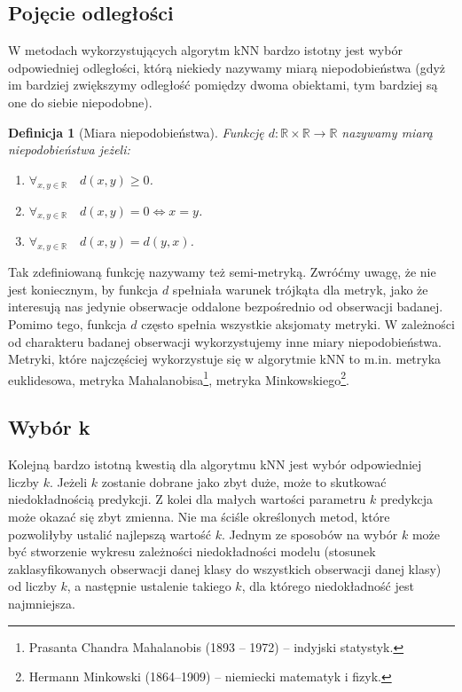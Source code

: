 \documentclass[a4paper]{article}
\newtheorem{defi} {Definicja}
\begin{document}
\subsection{Pojęcie odległości}
W metodach wykorzystujących algorytm kNN bardzo istotny jest wybór odpowiedniej odległości, którą niekiedy nazywamy miarą niepodobieństwa (gdyż im bardziej zwiększymy odległość pomiędzy dwoma obiektami, tym bardziej są one do siebie niepodobne).
\begin{defi}[Miara niepodobieństwa]
Funkcję $d: \mathbb{R} \times \mathbb{R} \to \mathbb{R}$ nazywamy miarą niepodobieństwa jeżeli:
\begin{enumerate}
    \item $\forall_{x,y\in\mathbb{R}}\quad d(x,y) \geq 0$.
    \item $\forall_{x,y\in\mathbb{R}}\quad d(x,y) = 0 \iff x = y$.
    \item $\forall_{x,y\in\mathbb{R}}\quad d(x,y) = d(y,x)$.
\end{enumerate}
\end{defi}
Tak zdefiniowaną funkcję nazywamy też semi-metryką. Zwróćmy uwagę, że nie jest koniecznym, by funkcja $d$ spełniała warunek trójkąta dla metryk, jako że interesują nas jedynie obserwacje oddalone bezpośrednio od obserwacji badanej. Pomimo tego, funkcja $d$ często spełnia wszystkie aksjomaty metryki. W zależności od charakteru badanej obserwacji wykorzystujemy inne miary niepodobieństwa.  Metryki, które najczęściej wykorzystuje się w algorytmie kNN to m.in. metryka euklidesowa, metryka Mahalanobisa\footnote{Prasanta Chandra Mahalanobis (1893 -- 1972) -- indyjski statystyk.}, metryka Minkowskiego\footnote{Hermann Minkowski (1864--1909) -- niemiecki matematyk i fizyk.}.
\subsection{Wybór k}
Kolejną bardzo istotną kwestią dla algorytmu kNN jest wybór odpowiedniej liczby $k$. Jeżeli $k$ zostanie dobrane jako zbyt duże, może to skutkować niedokładnością predykcji. Z kolei dla małych wartości parametru $k$ predykcja może okazać się zbyt zmienna. Nie ma ściśle określonych metod, które pozwoliłyby ustalić najlepszą wartość $k$. Jednym ze sposobów na wybór $k$ może być stworzenie wykresu zależności niedokładności modelu (stosunek zaklasyfikowanych obserwacji danej klasy do wszystkich obserwacji danej klasy) od liczby $k$, a następnie ustalenie takiego $k$, dla którego niedokładność jest najmniejsza.

\newpage
\end{document}
